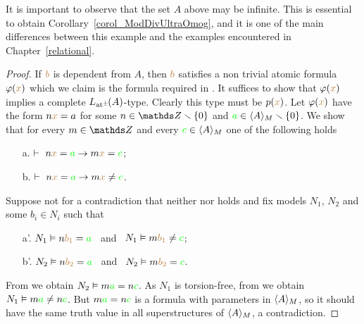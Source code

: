 \documentclass[creche.tex]{subfiles}
\begin{document}
It is important to observe that the set $A$ above may be infinite. This is essential to obtain Corollary~\ref{corol_ModDivUltraOmog}, and it is one of the main differences between this example and the examples encountered in Chapter~\ref{relational}. %

\begin{proof}
If ${\color{brown} b}$ is dependent from $A$, then ${\color{brown} b}$ satisfies a non trivial atomic formula $\varphi({\color{brown} x})$ which we claim is the formula required in . It suffices to show that $\varphi({\color{brown} x})$ implies a complete $L_{{\tiny\rm at^\pm}}\hskip-.3ex(A)$-type. Clearly this type must be $p({\color{brown} x})$. Let $\varphi({\color{brown} x})$ have the form $n{\color{brown} x}=a$ for some $n\in\ZZ\sm\{0\}$ and ${\color{green} a}\in\langle A\rangle_M\smallsetminus\{0\}$. We show that for every $m\in\ZZ$ and every ${\color{green} c}\in\langle A\rangle_M$ one of the following holds
\begin{itemize}
\item[a.] $\vdash\   n{\color{brown} x}={\color{green} a}\rightarrow m{\color{brown} x}={\color{green} c}$;
\item[b.] $\vdash\   n{\color{brown} x}={\color{green} a}\rightarrow m{\color{brown} x}\neq {\color{green}c}$.
\end{itemize} 
Suppose not for a contradiction that neither  nor  holds and fix models $N_1$, $N_2$ and some $b_i\in N_i$ such that
\begin{itemize}
\item[a'.] $N_1\vDash n{\color{brown} b_1}={\color{green} a}$ \ and \ $N_1\vDash m{\color{brown} b_1}\neq {\color{green}c}$;
\item[b'.] $N_2\vDash n{\color{brown} b_2}={\color{green} a}$ \ and \ $N_2\vDash m{\color{brown} b_2} = {\color{green} c}$.
\end{itemize} 
From  we obtain $N_2\vDash m{\color{green} a}=n{\color{green} c}$. As $N_1$ is torsion-free, from  we obtain $N_1\vDash m{\color{green} a}\neq n{\color{green} c}$. But $m{\color{green} a}=n{\color{green} c}$ is a formula with parameters in $\langle A\rangle_M$, so it should have the same truth value in all superstructures of $\langle A\rangle_M$, a contradiction.
\end{proof}




\end{document}
